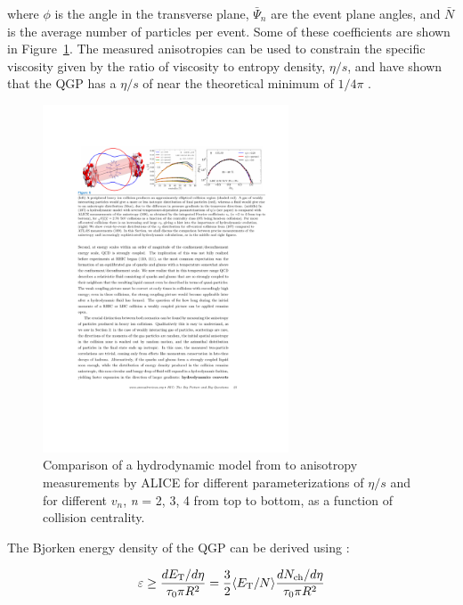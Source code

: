 where $\phi$ is the angle in the transverse plane, $\bar{\Psi}_n$ are the event plane angles, and $\bar{N}$ is the average number of particles per event. Some of these coefficients are shown in Figure~\ref{fig:flow_coeff}. The measured anisotropies can be used to constrain the specific viscosity given by the ratio of viscosity to entropy density, $\eta / s$, and have shown that the QGP has a $\eta / s$ of near the theoretical minimum of $1/4\pi$ \cite{Heinz:2013th}.


\begin{figure}[htbp]
\begin{center}
\includegraphics[width=0.65\textwidth]{figures/theory/flow_coefficients}
\caption{Comparison of a hydrodynamic model from \cite{Niemi:2015qia} to anisotropy measurements by ALICE \cite{ALICE:2011ab} for different parameterizations of $\eta / s $ and for different $v_n$, {\it{n}} = 2, 3, 4 from top to bottom, as a function of collision centrality.}
\label{fig:flow_coeff}
\end{center}
\end{figure}

The Bjorken energy density of the QGP can be derived using \cite{PhysRevD.27.140}:

\begin{align}
\varepsilon \geq \frac{d\mbox{$E_{\mathrm{T}}$}/d\eta}{\tau_0 \pi R^2} = \frac{3}{2} \langle \mbox{$E_{\mathrm{T}}$}/N \rangle \frac{d\mbox{$N_{\mathrm{ch}}$}/d\eta}{\tau_0 \pi R^2}
\end{align}

